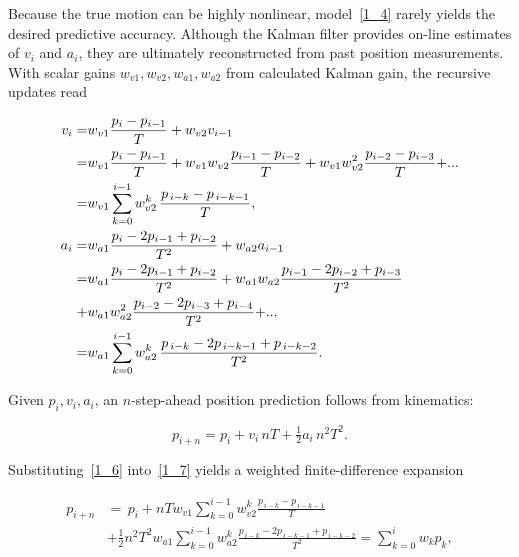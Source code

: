 \documentclass[sn-nature]{sn-jnl}%
\theoremstyle{thmstyleone}%
\theoremstyle{thmstyletwo}%
\theoremstyle{thmstylethree}%
\begin{document}
\noindent

\medskip
Because the true motion can be highly nonlinear, model~\eqref{1_4} rarely yields the desired predictive accuracy.  Although the Kalman filter provides on-line estimates of \(v_i\) and \(a_i\), they are ultimately reconstructed from past position measurements.  With scalar gains \(w_{v1},w_{v2},w_{a1},w_{a2}\) from calculated Kalman gain, the recursive updates read

\begin{equation}
\label{1_6}
\begin{aligned}
{v_i} =& {w_{v1}}\frac{{{p_i} - {p_{i - 1}}}}{T} + {w_{v2}}{v_{i - 1}}\\
    =& {w_{v1}}\frac{{{p_i} - {p_{i - 1}}}}{T} + {w_{v1}}{w_{v2}}\frac{{{p_{i - 1}} - {p_{i - 2}}}}{T} + {w_{v1}}w_{v2}^{\rm{2}}\frac{{{p_{i - {\rm{2}}}} - {p_{i - {\rm{3}}}}}}{T}{\rm{ + }}...\\
    =& w_{v1}\sum_{k=0}^{i-1} w_{v2}^{k}\,
       \frac{p_{\,i-k}-p_{\,i-k-1}}{T},\\
{a_i} =& {w_{a1}}\frac{{{p_i} - 2{p_{i - 1}} + {p_{i - 2}}}}{{{T^2}}} + {w_{a2}}{a_{i - 1}}\\
    =& {w_{a1}}\frac{{{p_i} - 2{p_{i - 1}} + {p_{i - 2}}}}{{{T^2}}}+ {w_{a1}}{w_{a2}}\frac{{{p_{i - 1}} - 2{p_{i - 2}} + {p_{i - 3}}}}{{{T^2}}} \\
    +& {w_{a1}}w_{a2}^{\rm{2}}\frac{{{p_{i - 2}} - 2{p_{i - 3}} + {p_{i - 4}}}}{{{T^2}}}{\rm{ + }}...\\
    =& w_{a1}\sum_{k=0}^{i-1} w_{a2}^{k}\,
        \frac{p_{\,i-k}-2p_{\,i-k-1}+p_{\,i-k-2}}{T^{2}} .
\end{aligned}
\end{equation}

\noindent
Given \(p_i,v_i,a_i\), an \(n\)-step-ahead position prediction follows from kinematics:

\begin{equation}
\label{1_7}
p_{i+n}=p_i+v_i\,nT+\tfrac12 a_i\,n^{2}T^{2}.
\end{equation}

\noindent
Substituting~\eqref{1_6} into~\eqref{1_7} yields a weighted finite-difference expansion

\begin{equation}
\label{1_8}
\begin{aligned}
p_{i+n} &=\, p_i + nTw_{v1}\sum_{k=0}^{i-1} w_{v2}^{k} \frac{p_{\,i-k}-p_{\,i-k-1}}{T}\\
&+\tfrac12 n^{2}T^{2} w_{a1}\sum_{k=0}^{i-1} w_{a2}^{k}\frac{p_{\,i-k}-2p_{\,i-k-1}+p_{\,i-k-2}}{T^{2}} = \sum_{k=0}^{i} w_k p_k,
\end{aligned}
\end{equation}
\end{document}
